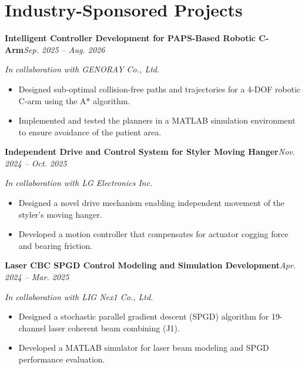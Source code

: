 \documentclass[10pt,letterpaper]{article}
\newcommand{\entry}[4]{\textbf{#1}\hfill\textit{#2}\par\nopagebreak\textit{#3}\hfill{#4}\par\nopagebreak}
\newcommand{\entrygap}{\vspace{3pt}}
\begin{document}
\section{Industry-Sponsored Projects}
\entry{Intelligent Controller Development for PAPS-Based Robotic C-Arm}{Sep. 2025 -- Aug. 2026}{In collaboration with GENORAY Co., Ltd.}{}
\begin{itemize}
  \item Designed sub-optimal collision-free paths and trajectories for a 4-DOF robotic C-arm using the A* algorithm.
  \item Implemented and tested the planners in a MATLAB simulation environment to ensure avoidance of the patient area.
\end{itemize}
\entrygap
\entry{Independent Drive and Control System for Styler Moving Hanger}{Nov. 2024 -- Oct. 2025}{In collaboration with LG Electronics Inc.}{}
\begin{itemize}
  \item Designed a novel drive mechanism enabling independent movement of the styler's moving hanger.
  \item Developed a motion controller that compensates for actuator cogging force and bearing friction.
\end{itemize}
\entrygap
\entry{Laser CBC SPGD Control Modeling and Simulation Development}{Apr. 2024 -- Mar. 2025}{In collaboration with LIG Nex1 Co., Ltd.}{}
\begin{itemize}
  \item Designed a stochastic parallel gradient descent (SPGD) algorithm for 19-channel laser coherent beam combining (J1).
  \item Developed a MATLAB simulator for laser beam modeling and SPGD performance evaluation.
\end{itemize}

\end{document}

